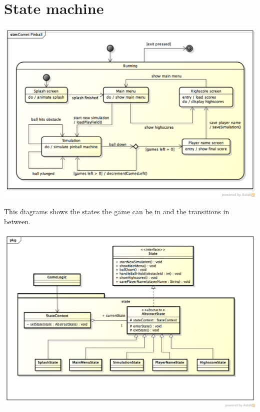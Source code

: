 \documentclass[fontsize=12pt,
               paper=a4,
               twoside=false,
               parskip=half,
               ]{scrartcl}
\begin{document}
\section{State machine}
\includegraphics[width=15.5cm]{./img/state-machine.png}

This diagrams shows the states the game can be in and the transitions in between. 

\includegraphics[width=15.5cm]{./img/state-pattern.png}
\end{document}
